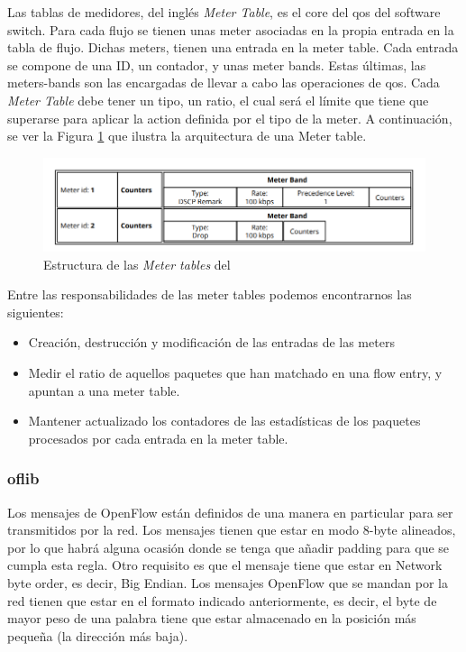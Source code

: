 Las tablas de medidores, del inglés \textit{Meter Table}, es el core del \gls{qos} del software switch. Para cada flujo se tienen unas meter asociadas en la propia entrada en la tabla de flujo. Dichas meters, tienen una entrada en la meter table. Cada entrada se compone de una ID, un contador, y unas meter bands. Estas últimas, las meters-bands son las encargadas de llevar a cabo las operaciones de \gls{qos}. Cada \textit{Meter Table} debe tener un tipo, un ratio, el cual será el límite que tiene que superarse para aplicar la action definida por el tipo de la meter. A continuación, se ver la Figura \ref{fig:bofuss5} que ilustra la arquitectura de una Meter table.

\begin{figure}[ht]
    \centering
    \includegraphics[width=\textwidth]{archivos/img/teoria/bofuss5.png}
    \caption{Estructura de las \textit{Meter tables} del  \cite{fernandes2015software}}
    \label{fig:bofuss5}
\end{figure}

Entre las responsabilidades de las meter tables podemos encontrarnos las siguientes:

\begin{itemize}
    \item Creación, destrucción y modificación de las entradas de las meters
    \item Medir el ratio de aquellos paquetes que han matchado en una flow entry, y apuntan a una meter table.
    \item Mantener actualizado los contadores de las estadísticas de los paquetes procesados por cada entrada en la meter table.
\end{itemize}

\subsubsection{oflib}

Los mensajes de OpenFlow están definidos de una manera en particular para ser transmitidos por la red. Los mensajes tienen que estar en modo 8-byte alineados, por lo que habrá alguna ocasión donde se tenga que añadir padding para que se cumpla esta regla. Otro requisito es que el mensaje tiene que estar en Network byte order, es decir, Big Endian. Los mensajes OpenFlow que se mandan por la red tienen que estar en el formato indicado anteriormente, es decir, el byte de mayor peso de una palabra tiene que estar almacenado en la posición más pequeña (la dirección más baja).\\


